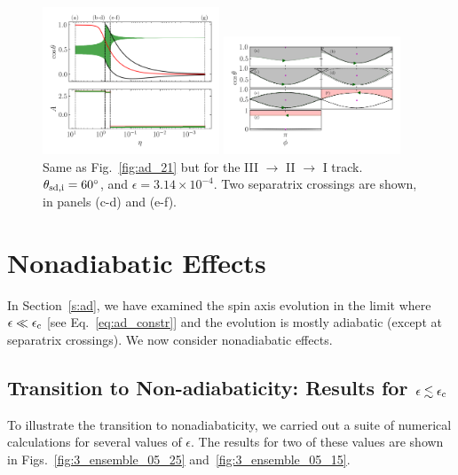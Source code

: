 \documentclass[twocolumn,twocolappendix]{aastex63}
\begin{document}
\begin{figure}
    \centering
    \includegraphics[width=0.47\textwidth]{plots_diskdisp/3testo321.png}

    \includegraphics[width=0.47\textwidth]{plots_diskdisp/3testo321_subplots.png}
    \caption{Same as Fig.~\ref{fig:ad_21} but for the III $\to$ II $\to$ I
    track. $\theta_{\rm sd, i} = 60^\circ$, and $\epsilon = 3.14 \times
    10^{-4}$. Two separatrix crossings are shown, in panels (c-d) and
    (e-f).}\label{fig:ad_321}
\end{figure}


\section{Nonadiabatic Effects}\label{s:nonad}

In Section~\ref{s:ad}, we have examined the spin axis evolution in the limit
where $\epsilon \ll \epsilon_{\rm c}$ [see Eq.~\eqref{eq:ad_constr}] and the
evolution is mostly adiabatic (except at separatrix crossings). We now consider
nonadiabatic effects.

\subsection{Transition to Non-adiabaticity: Results for $\epsilon\lesssim
\epsilon_{\rm c}$}\label{ss:transition}

To illustrate the transition to nonadiabaticity, we carried out a suite of
numerical calculations for several values of $\epsilon$. The results for two of
these values are shown in Figs.~\ref{fig:3_ensemble_05_25}
and~\ref{fig:3_ensemble_05_15}.
\end{document}
